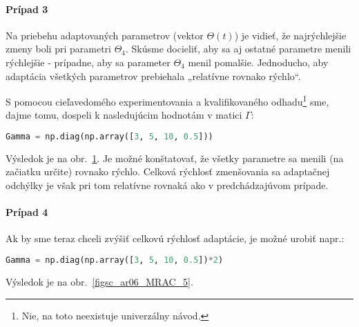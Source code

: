 \documentclass[a4paper, 10pt, ]{article}
\begin{document}
\paragraph{Prípad 3}

Na priebehu adaptovaných parametrov (vektor $\Theta(t)$) je vidieť, že najrýchlejšie zmeny boli pri parametri $\Theta_4$. Skúsme docieliť, aby sa aj ostatné parametre menili rýchlejšie - prípadne, aby sa parameter $\Theta_4$ menil pomalšie. Jednoducho, aby adaptácia všetkých parametrov prebiehala „relatívne rovnako rýchlo“.

S pomocou cieľavedomého experimentovania a kvalifikovaného odhadu\footnote{Nie, na toto neexistuje univerzálny návod.} sme, dajme tomu, dospeli k nasledujúcim hodnotám v matici $\Gamma$:
\begin{lstlisting}[language=Python,
                    numbers=none,
                    ]
Gamma = np.diag(np.array([3, 5, 10, 0.5]))
\end{lstlisting}
Výsledok je na obr.~\ref{figsc_ar06_MRAC_4}. Je možné konštatovať, že všetky parametre sa menili (na začiatku určite) rovnako rýchlo. Celková rýchlosť zmenšovania sa adaptačnej odchýlky je však pri tom relatívne rovnaká ako v predchádzajúvom prípade.





\begin{figure}[!t]
	\centering

    \vspace{-3mm}


    \vspace{-2mm}

	\caption{}
	\label{figsc_ar06_MRAC_4}


    \vspace{-2mm}

\end{figure}









\paragraph{Prípad 4}

Ak by sme teraz chceli zvýšiť celkovú rýchlosť adaptácie, je možné urobiť napr.:
\begin{lstlisting}[language=Python,
                    numbers=none,
                    ]
Gamma = np.diag(np.array([3, 5, 10, 0.5])*2)
\end{lstlisting}
Výsledok je na obr.~\ref{figsc_ar06_MRAC_5}.
\end{document}
